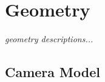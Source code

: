 \chapter{Geometry}\label{ch:geometry}
\begin{center}
{\small\em geometry descriptions...}
\end{center}

\section{Camera Model}

\newpage
